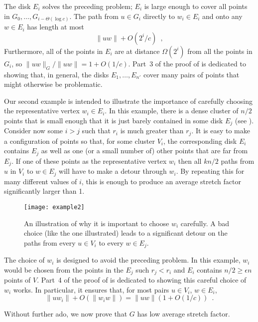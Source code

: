 \documentclass{patmorin}
\begin{document}
The disk $E_i$ solves the preceding problem; $E_i$ is large enough to
cover all points in $G_0,\ldots,G_{i-\Theta(\log c)}$.  The path from
$u\in G_i$ directly to $w_i\in E_i$ and onto any $w\in E_i$ has length
at most
\[
    \|uw\| + O(2^{i}/c) \enspace ,
\]
Furthermore, all of the points in $E_i$ are at distance $\Omega(2^i)$ from
all the points in $G_i$, so $\|uw\|_G/\|uw\| = 1+O(1/c)$.  Part~3 of the
proof of  is dedicated to showing that, in general,
the disks $E_1,\ldots,E_{n'}$ cover many pairs of points that might
otherwise be problematic.

Our second example is intended to illustrate the importance of carefully
choosing the representative vertex $w_i\in E_i$.   In this example,
there is a dense cluster of $n/2$ points that is small enough that it
is just barely contained in some disk $E_j$ (see ).
Consider now some $i>j$ such that $r_i$ is much greater than $r_j$.
It is easy to make a configuration of points so that, for some cluster
$V_i$, the corresponding disk $E_i$ contains $E_j$ as well as one (or a
small number of) other points that are far from $E_j$. If one of these
points as the representative vertex $w_i$ then all $kn/2$ paths from
$u$ in $V_i$ to $w\in E_j$ will have to make a detour through $w_i$.
By repeating this for many different values of $i$, this is enough to
produce an average stretch factor significantly larger than 1.

\begin{figure}
  \begin{center}
    \texttt{[image: example2]}
  \end{center}
  \caption{An illustration of why it is important to choose $w_i$ carefully.
    A bad choice (like the one illustrated) leads to a significant detour
    on the paths from every $u\in V_i$ to every $w\in E_j$.}
\end{figure}




The choice of $w_i$ is designed to avoid the preceding problem.  In this
example, $w_i$ would be chosen from the points in the $E_j$ such $r_j <
r_i$ and $E_i$ contains $n/2\ge \epsilon n$ points of $V$.  Part~4 of
the proof of  is dedicated to showing this careful
choice of $w_i$ works.  In particular, it ensures that, for most pairs
$u\in V_i$, $w\in E_i$,
\[
    \|uw_i\| + O(\|w_iw\|) = \|uw\|(1+O(1/c)) \enspace .
\]

Without further ado, we now prove that $G$ has low average stretch factor.
\end{document}
